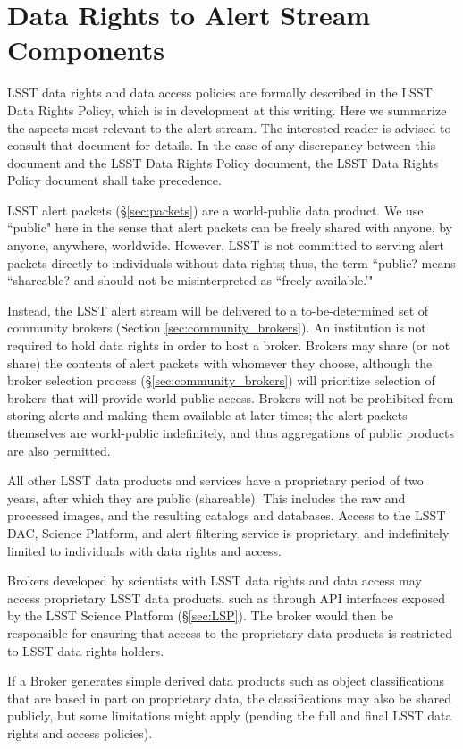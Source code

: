 \section{Data Rights to Alert Stream Components}\label{sec:data_rights}

LSST data rights and data access policies are formally described in the LSST Data Rights Policy, which is in development at this writing.
Here we summarize the aspects most relevant to the alert stream.
The interested reader is advised to consult that document for details.
In the case of any discrepancy between this document and the LSST Data Rights Policy document, the LSST Data Rights Policy document shall take precedence.

LSST alert packets (\S \ref{sec:packets}) are a world-public data product.
We use ``public" here in the sense that alert packets can be freely shared with anyone, by anyone, anywhere, worldwide.
However, LSST is not committed to serving alert packets directly to individuals without data rights; thus, the term ``public? means ``shareable? and should not be misinterpreted as ``freely available.'"

Instead, the LSST alert stream will be delivered to a to-be-determined set of community brokers (Section \ref{sec:community_brokers}).
An institution is not required to hold data rights in order to host a broker.
Brokers may share (or not share) the contents of alert packets with whomever they choose, although the broker selection process (\S \ref{sec:community_brokers}) will prioritize selection of brokers that will provide world-public access.
Brokers will not be prohibited from storing alerts and making them available at later times; the alert packets themselves are world-public indefinitely, and thus aggregations of public products are also permitted.

All other LSST data products and services have a proprietary period of two years, after which they are public (shareable).
This includes the raw and processed images, and the resulting catalogs and databases.
Access to the LSST DAC, Science Platform, and alert filtering service is proprietary, and indefinitely limited to individuals with data rights and access.

Brokers developed by scientists with LSST data rights and data access may access proprietary LSST data products, such as through API interfaces exposed by the LSST Science Platform  (\S \ref{sec:LSP}).
The broker would then be responsible for ensuring that access to the proprietary data products is restricted to LSST data rights holders.

If a Broker generates simple derived data products such as object classifications that are based in part on proprietary data, the classifications may also be shared publicly, but some limitations might apply (pending the full and final LSST data rights and access policies).
